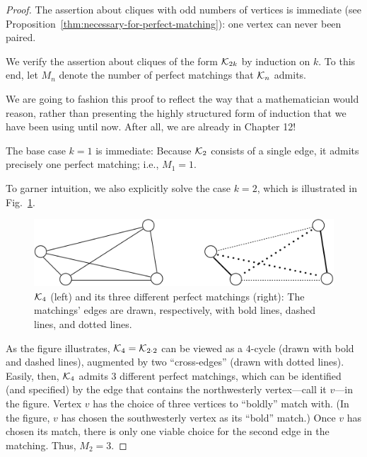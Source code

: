 \begin{proof}
The assertion about cliques with odd numbers of vertices is immediate
(see Proposition~\ref{thm:necessary-for-perfect-matching}): one vertex can never been paired.

\smallskip

We verify the assertion about cliques of the form $\mbox{$\cal K$}_{2k}$ by induction on $k$.  To this end, let $M_n$ denote the number of perfect matchings that $\mbox{$\cal K$}_n$ admits.

\smallskip

We are going to fashion this proof to reflect the way that a mathematician would reason, rather than presenting the highly structured form of induction that we have been using until now.  After all, we are already in Chapter 12!

\medskip

\noindent 
The base case $k=1$ is immediate:  Because $\mbox{$\cal K$}_{2}$ consists of a single edge, it admits precisely one perfect matching; i.e., $M_1 = 1$.

\smallskip

To garner intuition, we also explicitly solve the case $k=2$, which is illustrated in Fig.~\ref{fig:AllPerfectMatchings}.
\begin{figure}[hbt]
\begin{center}
       \includegraphics[scale=0.55]{FiguresGraph/perfectmatchingAll}
       \caption{$\mbox{$\cal K$}_4$ (left) and its three different perfect matchings (right):  The matchings' edges are drawn, respectively, with bold lines, dashed lines, and dotted lines.}
  \label{fig:AllPerfectMatchings}
\end{center}
\end{figure}
As the figure illustrates, $\mbox{$\cal K$}_4 = \mbox{$\cal K$}_{2 \cdot 2}$ can be viewed as a $4$-cycle (drawn with bold and dashed lines), augmented by two ``cross-edges'' (drawn with dotted lines).  Easily, then, $\mbox{$\cal K$}_4$ admits $3$ different perfect matchings, which can be identified (and specified) by the edge that contains the northwesterly vertex---call it $v$---in the figure.  Vertex $v$ has the choice of three vertices to ``boldly'' match with. (In the figure, $v$ has chosen the southwesterly vertex as its ``bold'' match.)  Once $v$ has chosen its match, there is only one viable choice for the second edge in the matching.  Thus, $M_2=3$.


\end{proof}
